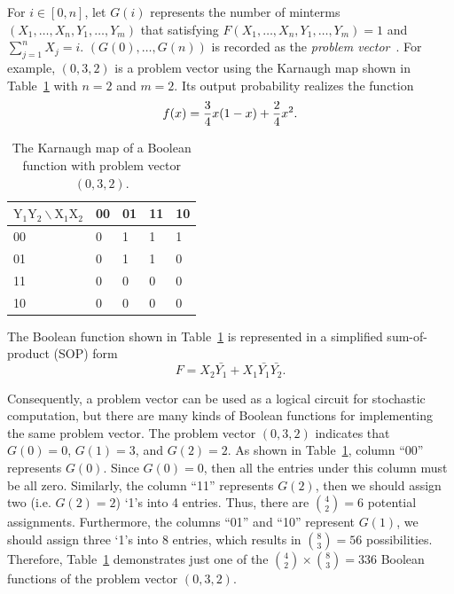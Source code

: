 \documentclass[conference,letterpaper]{IEEEtran}
\begin{document}
For $i\in[0,n]$, let $G(i)$ represents the number of minterms $(X_{1}, \ldots, X_{n}, Y_{1}, \ldots, Y_{m})$ that satisfying $F(X_{1}, \ldots, X_{n}, Y_{1}, \ldots, Y_{m})=1$ and $\sum_{j=1}^{n} X_{j}=i$. $(G(0), \ldots, G(n))$ is recorded as the \emph{problem vector}~\cite{Cube-Assignment}. For example, $(0, 3, 2)$ is a problem vector using the Karnaugh map shown in Table~\ref{tab:tt} with $n=2$ and $m=2$. Its output probability realizes the function
\begin{equation}
f(x)=\frac{3}{4} x(1-x)+\frac{2}{4} x^{2}.\vspace{-2ex}
\end{equation}


\begin{table}[htbp]
\setlength{\abovecaptionskip}{0.cm}
\setlength{\belowcaptionskip}{0.pt}
\setlength{\tabcolsep}{1mm}
\caption{The Karnaugh map of a Boolean function with problem vector $(0, 3, 2)$.}
\centering \label{tab:tt}
\begin{tabular}{p{2cm}<{\centering} p{1.25cm}<{\centering} p{1.25cm}<{\centering} p{1.25cm}<{\centering} p{1.25cm}<{\centering}}
\toprule
$\mathrm{Y}_{1} \mathrm{Y}_{2} \backslash \mathrm{X}_{1} \mathrm{X}_{2}$ & 00 & 01 & 11 & 10 \\
\midrule
00 &0 & 1 & 1 & 1 \\
01 &0 & 1 & 1 &0 \\
11 &0 &0  &0  &0 \\
10 &0 &0 &0   &0 \\
\bottomrule
\end{tabular}
\end{table}

The Boolean function shown in Table~\ref{tab:tt} is represented in a simplified sum-of-product (SOP) form
\begin{equation}
F=X_{2}\bar{Y_{1}}+X_{1} \bar{Y_{1}}\bar{Y_{2}}.
\end{equation}

Consequently, a problem vector can be used as a logical circuit for stochastic computation, but there are many kinds of Boolean functions for implementing the same problem vector.
The problem vector $(0, 3, 2)$ indicates that $G(0)=0$, $G(1)=3$, and $G(2)=2$.
As shown in Table~\ref{tab:tt}, column ``00'' represents $G(0)$. Since $G(0)=0$, then all the entries under this column must be all zero.
Similarly, the column ``11'' represents $G(2)$, then we should assign two (i.e. $G(2)=2$) `1's into 4 entries. Thus, there are $\binom{4}{2}=6$ potential assignments.
Furthermore, the columns ``01'' and ``10'' represent $G(1)$, we should assign three `1's into 8 entries, which results in $\binom{8}{3}=56$ possibilities.
Therefore, Table~\ref{tab:tt} demonstrates just one of the $\binom{4}{2} \times \binom{8}{3} = 336$ Boolean functions of the problem vector $(0, 3, 2)$.
\end{document}
